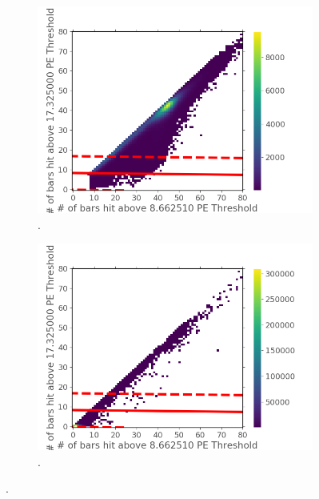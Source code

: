 \begin{figure}[htbp]
\centering
\begin{subfigure}{.5\textwidth}
  \centering
  \includegraphics[width=\linewidth]{Chapter5/Figs/Raster/Cosmic8BarSignalCutSVM.png}
  \captionsetup{width=.9\linewidth}
  \caption{.}
  \label{subFig:cosmic8BarSignalCutSVM}
\end{subfigure}%
\begin{subfigure}{.5\textwidth}
  \centering
\includegraphics[width=\linewidth]{Chapter5/Figs/Raster/Cosmic8BarNoiseCutSVM.png}
  \captionsetup{width=.9\linewidth}
  \caption{.}
  \label{subFig:cosmic8BarNoiseCutSVM}
\end{subfigure}
\caption{.}
\label{fig:cosmic8BarSignalNoiseCutSVM}
\end{figure}

